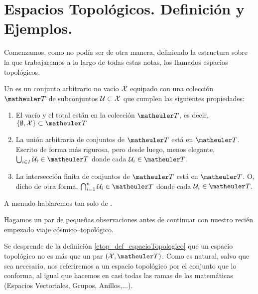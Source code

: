 \section{Espacios Topológicos. Definición y Ejemplos.}
\label{etop_definicionEjemplos}
Comenzamos, como no podía ser de otra manera, definiendo la estructura sobre la que trabajaremos a lo largo de todas estas notas, los llamados espacios topológicos.
\begin{defi}[Espacio Topológico]
	\label{etop_def_espacioTopologico}
	Un  es un conjunto arbitrario no vacío $\mathcal{X}$ equipado con una colección $\T$ de subconjuntos $\mathcal{U}\subset\mathcal{X}$ que cumplen las siguientes propiedades:
	\begin{enumerate}
		\item[\tb{T1}] El vacío y el total están en la colección $\T$, es decir, $\{\emptyset, \X\} \subset \T$
		\item[\tb{T2}] La unión arbitraria de conjuntos de $\T$ está en $\T$. Escrito de forma más rigurosa, pero desde luego, menos elegante, 
		$\bigcup_{i\in I}\U_i\in\T$ donde cada $\U_i\in\T$.
		\item[\tb{T3}] La intersección finita de conjuntos de $\T$ está en $\T$. O, dicho de otra forma, $\bigcap_{i=1}^{n}\U_i\in\T$ donde cada $\U_i\in\T$.
	\end{enumerate}
	
	A menudo hablaremos tan solo de .
\end{defi}
Hagamos un par de pequeñas observaciones antes de continuar con nuestro recién empezado viaje cósmico--topológico.
\begin{obs}[Sutilezas]
	\label{etop_obs_sutilezas}
	Se desprende de la definición \ref{etop_def_espacioTopologico} que un espacio topológico no es más que un par $(\X, \T)$. Como es natural, salvo que sea necesario, nos referiremos a un espacio topológico por el conjunto que lo conforma, al igual que hacemos en casi todas las ramas de las matemáticas (Espacios Vectoriales, Grupos, Anillos,...).
\end{obs}
